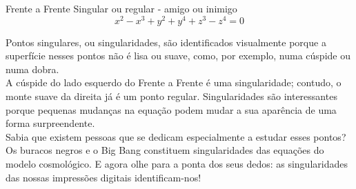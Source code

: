 \begin{surferPage}{Frente a Frente}
Singular ou regular - amigo ou inimigo\\
\smallskip
\[x^2	- x^3+ y^2+ y^4+ z^3- z^4	=  0\]

\vspace{0.3cm}
Pontos singulares, ou singularidades, s\~ao identificados visualmente porque a superf\'icie nesses pontos n\~ao \'e lisa ou suave, como,  por exemplo,  numa c\'uspide ou numa dobra.\\
\vspace{0.3cm}
A c\'uspide do lado esquerdo do Frente a Frente \'e uma singularidade; contudo, o monte suave da direita j\'a \'e um ponto regular. Singularidades s\~ao interessantes porque pequenas mudan\c cas na equa\c c\~ao podem mudar a sua apar\^encia de uma forma surpreendente. \\

\vspace{0.3cm}
Sabia que existem pessoas que se dedicam especialmente a estudar esses pontos? Os buracos negros e o Big Bang constituem singularidades das equa\c c\~oes do modelo cosmol\'ogico. E agora olhe para a ponta dos seus dedos: as singularidades das nossas impress\~oes digitais identificam-nos!
\end{surferPage}
